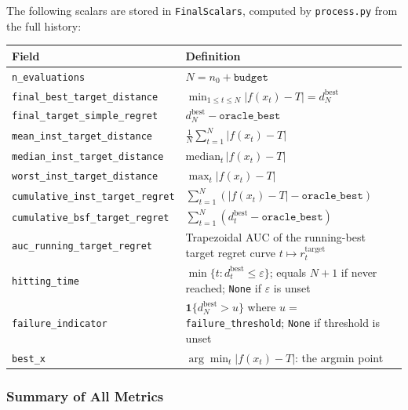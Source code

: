 \documentclass[11pt]{article}
\newcommand{\rtarget}{r_t^{\mathrm{target}}}
\begin{document}
The following scalars are stored in \texttt{FinalScalars}, computed by
\texttt{process.py} from the full history:
 
\begin{center}
\begin{longtable}{lp{8.5cm}}
\toprule
Field & Definition \\
\midrule
\endhead
\texttt{n\_evaluations}
  & $N = n_0 + \texttt{budget}$ \\
\texttt{final\_best\_target\_distance}
  & $\min_{1 \le t \le N} |f(x_t) - T|
    = d_N^{\mathrm{best}}$ \\
\texttt{final\_target\_simple\_regret}
  & $d_N^{\mathrm{best}} - \texttt{oracle\_best}$ \\
\texttt{mean\_inst\_target\_distance}
  & $\frac{1}{N}\sum_{t=1}^{N}|f(x_t)-T|$ \\
\texttt{median\_inst\_target\_distance}
  & $\mathrm{median}_{t}\,|f(x_t)-T|$ \\
\texttt{worst\_inst\_target\_distance}
  & $\max_{t}|f(x_t)-T|$ \\
\texttt{cumulative\_inst\_target\_regret}
  & $\sum_{t=1}^{N}(|f(x_t)-T|-\texttt{oracle\_best})$ \\
\texttt{cumulative\_bsf\_target\_regret}
  & $\sum_{t=1}^{N}(d_t^{\mathrm{best}}-\texttt{oracle\_best})$ \\
\texttt{auc\_running\_target\_regret}
  & Trapezoidal AUC of the running-best target regret
    curve $t \mapsto \rtarget$ \\
\texttt{hitting\_time}
  & $\min\{t : d_t^{\mathrm{best}} \le \varepsilon\}$;
    equals $N+1$ if never reached;
    \texttt{None} if $\varepsilon$ is unset \\
\texttt{failure\_indicator}
  & $\mathbf{1}\{d_N^{\mathrm{best}} > u\}$
    where $u =$ \texttt{failure\_threshold};
    \texttt{None} if threshold is unset \\
\texttt{best\_x}
  & $\arg\min_t |f(x_t)-T|$: the argmin point \\
\bottomrule
\end{longtable}
\end{center}
 
\subsubsection{Summary of All Metrics}
 
\end{document}
